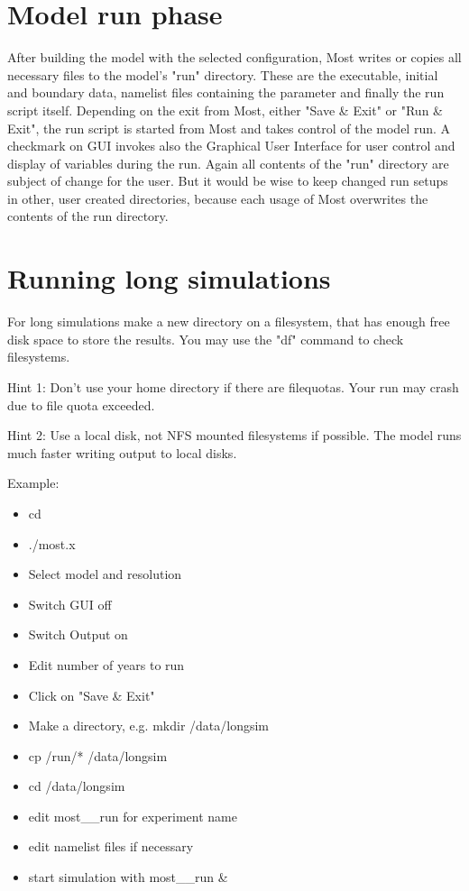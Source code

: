 \section{Model run phase}

After building the model with the selected configuration,
Most writes or copies all necessary files to the model's
"run" directory. These are the executable, initial and boundary data,
namelist files containing the parameter and finally the
run script itself. Depending on the exit from Most,
either "Save  \& Exit" or "Run \& Exit", the run script is started
from Most and takes control of the model run. A checkmark on
GUI invokes also the 
Graphical User Interface for user control and display
of variables during the run.
Again all contents of the "run" directory are subject of change
for the user. But it would be wise to keep changed run setups
in other, user created directories, because each usage of
Most overwrites the contents of the run directory.

\section{Running long simulations}

For long simulations make a new directory on a filesystem,
that has enough free disk space to store the results.
You may use the "df" command to check filesystems.

Hint 1: Don't use your home directory if there are filequotas.
Your run may crash due to file quota exceeded.

Hint 2: Use a local disk, not NFS mounted filesystems if possible.
The model runs much faster writing output to local disks.

Example:

\begin{itemize}
\item cd {\most}
\item ./most.x
\item Select model and resolution
\item Switch GUI off
\item Switch Output on
\item Edit number of years to run
\item Click on "Save \& Exit"
\item Make a directory, e.g. mkdir /data/longsim
\item cp \modir/run/* /data/longsim
\item cd /data/longsim
\item edit most\_\modir\_run for experiment name
\item edit namelist files if necessary
\item start simulation with most\_\modir\_run \&
\end{itemize}

